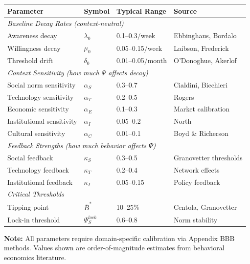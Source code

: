 \begin{tcolorbox}[colback=gray!5!white, colframe=gray!75!black,
    title=\textbf{UNTCM Parameter Summary Table}]
\begin{center}
\renewcommand{\arraystretch}{1.2}
\begin{tabular}{@{}llll@{}}
\toprule
\textbf{Parameter} & \textbf{Symbol} & \textbf{Typical Range} & \textbf{Source} \\
\midrule
\multicolumn{4}{l}{\textit{Baseline Decay Rates (context-neutral)}} \\
Awareness decay & $\lambda_0$ & 0.1--0.3/week & Ebbinghaus, Bordalo \\
Willingness decay & $\mu_0$ & 0.05--0.15/week & Laibson, Frederick \\
Threshold drift & $\delta_0$ & 0.01--0.05/month & O'Donoghue, Akerlof \\
\midrule
\multicolumn{4}{l}{\textit{Context Sensitivity (how much $\Psi$ affects decay)}} \\
Social norm sensitivity & $\alpha_S$ & 0.3--0.7 & Cialdini, Bicchieri \\
Technology sensitivity & $\alpha_T$ & 0.2--0.5 & Rogers \\
Economic sensitivity & $\alpha_E$ & 0.1--0.3 & Market calibration \\
Institutional sensitivity & $\alpha_I$ & 0.05--0.2 & North \\
Cultural sensitivity & $\alpha_C$ & 0.01--0.1 & Boyd \& Richerson \\
\midrule
\multicolumn{4}{l}{\textit{Feedback Strengths (how much behavior affects $\Psi$)}} \\
Social feedback & $\kappa_S$ & 0.3--0.5 & Granovetter thresholds \\
Technology feedback & $\kappa_T$ & 0.2--0.4 & Network effects \\
Institutional feedback & $\kappa_I$ & 0.05--0.15 & Policy feedback \\
\midrule
\multicolumn{4}{l}{\textit{Critical Thresholds}} \\
Tipping point & $\bar{B}^*$ & 10--25\% & Centola, Granovetter \\
Lock-in threshold & $\Psi_S^{lock}$ & 0.6--0.8 & Norm stability \\
\bottomrule
\end{tabular}
\end{center}

\textbf{Note:} All parameters require domain-specific calibration via Appendix BBB methods. Values shown are order-of-magnitude estimates from behavioral economics literature.

\end{tcolorbox}

